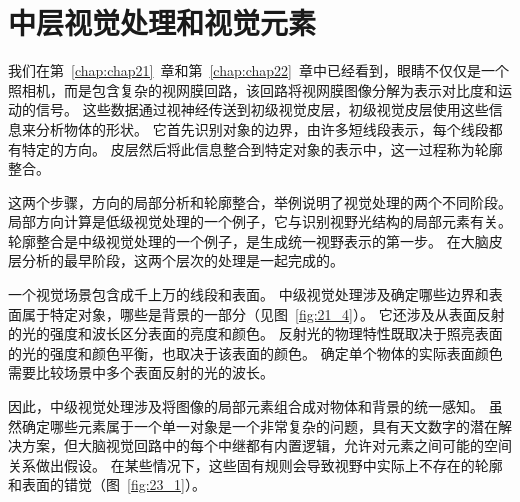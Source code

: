 \chapter{中层视觉处理和视觉元素} \label{chap:chap23}

我们在第~\ref{chap:chap21}~章和第~\ref{chap:chap22}~章中已经看到，眼睛不仅仅是一个照相机，而是包含复杂的视网膜回路，该回路将视网膜图像分解为表示对比度和运动的信号。
这些数据通过视神经传送到初级视觉皮层，初级视觉皮层使用这些信息来分析物体的形状。
它首先识别对象的边界，由许多短线段表示，每个线段都有特定的方向。
皮层然后将此信息整合到特定对象的表示中，这一过程称为轮廓整合。


这两个步骤，方向的局部分析和轮廓整合，举例说明了视觉处理的两个不同阶段。
局部方向计算是低级视觉处理的一个例子，它与识别视野光结构的局部元素有关。
轮廓整合是中级视觉处理的一个例子，是生成统一视野表示的第一步。
在大脑皮层分析的最早阶段，这两个层次的处理是一起完成的。


一个视觉场景包含成千上万的线段和表面。
中级视觉处理涉及确定哪些边界和表面属于特定对象，哪些是背景的一部分（见图~\ref{fig:21_4}）。
它还涉及从表面反射的光的强度和波长区分表面的亮度和颜色。
反射光的物理特性既取决于照亮表面的光的强度和颜色平衡，也取决于该表面的颜色。
确定单个物体的实际表面颜色需要比较场景中多个表面反射的光的波长。


因此，中级视觉处理涉及将图像的局部元素组合成对物体和背景的统一感知。
虽然确定哪些元素属于一个单一对象是一个非常复杂的问题，具有天文数字的潜在解决方案，但大脑视觉回路中的每个中继都有内置逻辑，允许对元素之间可能的空间关系做出假设。
在某些情况下，这些固有规则会导致视野中实际上不存在的轮廓和表面的错觉（图~\ref{fig:23_1}）。



